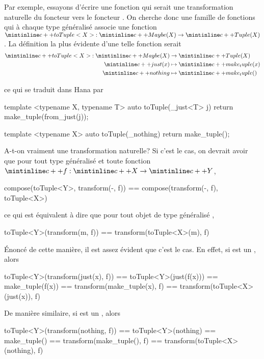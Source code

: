 Par exemple, essayons d'écrire une fonction qui serait une transformation
naturelle du foncteur  vers le foncteur . On cherche
donc une famille de fonctions qui à chaque type généralisé  associe
une fonction $\icpp{toTuple<X>} : \icpp{Maybe(X)} \to \icpp{Tuple(X)}$. La
définition la plus évidente d'une telle fonction serait
\begin{align*}
    \icpp{toTuple<X>} : \icpp{Maybe(X)} &\to \icpp{Tuple(X)} \\
                        \icpp{just(x)} &\mapsto \icpp{make_tuple(x)} \\
                        \icpp{nothing} &\mapsto \icpp{make_tuple()}
\end{align*}

ce qui se traduit dans Hana par
\begin{cpp}
    template <typename X, typename T>
    auto toTuple(_just<T> j) {
        return make_tuple(from_just(j));
    }

    template <typename X>
    auto toTuple(_nothing) {
        return make_tuple();
    }
\end{cpp}

A-t-on vraiment une transformation naturelle? Si c'est le cas, on devrait
avoir que pour tout type généralisé  et toute fonction
$\icpp{f} : \icpp{X} \to \icpp{Y}$,
\begin{cpp}
    compose(toTuple<Y>, transform(-, f)) == compose(transform(-, f), toTuple<X>)
\end{cpp}

ce qui est équivalent à dire que pour tout objet  de type généralisé
,
\begin{cpp}
    toTuple<Y>(transform(m, f)) == transform(toTuple<X>(m), f)
\end{cpp}

Énoncé de cette manière, il est assez évident que c'est le cas. En effet, si
 est un , alors
\begin{cpp}
    toTuple<Y>(transform(just(x), f)) == toTuple<Y>(just(f(x)))
                                      == make_tuple(f(x))
                                      == transform(make_tuple(x), f)
                                      == transform(toTuple<X>(just(x)), f)
\end{cpp}

De manière similaire, si  est un , alors
\begin{cpp}
    toTuple<Y>(transform(nothing, f)) == toTuple<Y>(nothing)
                                      == make_tuple()
                                      == transform(make_tuple(), f)
                                      == transform(toTuple<X>(nothing), f)
\end{cpp}

